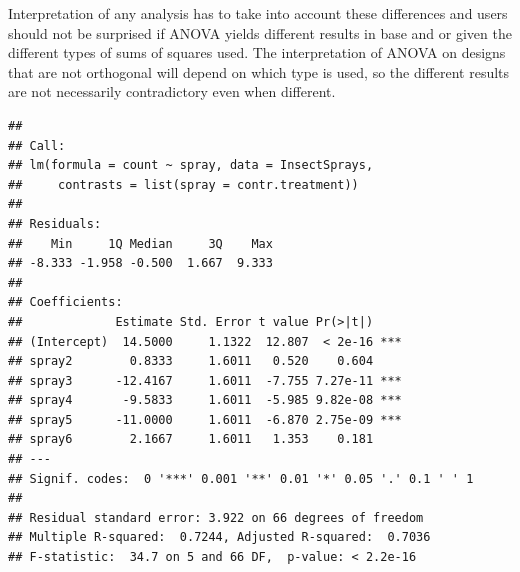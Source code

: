 \documentclass[krantz2]{krantz}\usepackage{knitr}
\begin{document}
\begin{warningbox}
Interpretation of any analysis has to take into account these differences and users should not be surprised if ANOVA yields different results in base \Rlang and  or  given the different types of sums of squares used. The interpretation of ANOVA on designs that are not orthogonal will depend on which type is used, so the different results are not necessarily contradictory even when different.

\begin{knitrout}\footnotesize
{}\color{fgcolor}\begin{kframe}
\begin{alltt}
\end{alltt}
\begin{verbatim}
##
## Call:
## lm(formula = count ~ spray, data = InsectSprays, 
##     contrasts = list(spray = contr.treatment))
##
## Residuals:
##    Min     1Q Median     3Q    Max
## -8.333 -1.958 -0.500  1.667  9.333
##
## Coefficients:
##             Estimate Std. Error t value Pr(>|t|)
## (Intercept)  14.5000     1.1322  12.807  < 2e-16 ***
## spray2        0.8333     1.6011   0.520    0.604
## spray3      -12.4167     1.6011  -7.755 7.27e-11 ***
## spray4       -9.5833     1.6011  -5.985 9.82e-08 ***
## spray5      -11.0000     1.6011  -6.870 2.75e-09 ***
## spray6        2.1667     1.6011   1.353    0.181
## ---
## Signif. codes:  0 '***' 0.001 '**' 0.01 '*' 0.05 '.' 0.1 ' ' 1
##
## Residual standard error: 3.922 on 66 degrees of freedom
## Multiple R-squared:  0.7244,	Adjusted R-squared:  0.7036
## F-statistic:  34.7 on 5 and 66 DF,  p-value: < 2.2e-16
\end{verbatim}
\end{kframe}
\end{knitrout}


\end{warningbox}
\end{document}
